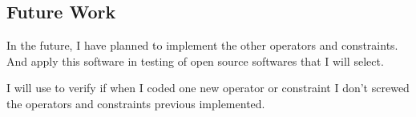 \subsection{Future Work}

In the future, I have planned to implement the other operators and constraints. And apply this software in testing of open source softwares that I will select.

I will use  to verify if when I coded one new operator or constraint I don't screwed the operators and constraints previous implemented.



